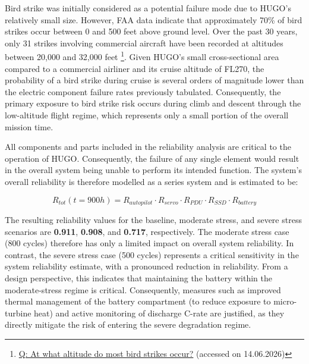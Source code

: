 Bird strike was initially considered as a potential failure mode due to HUGO’s relatively small size. However, FAA data indicate that approximately 70\% of bird strikes occur between 0 and 500 feet above ground level. Over the past 30 years, only 31 strikes involving commercial aircraft have been recorded at altitudes between 20,000 and 32,000 feet \footnote{\href{https://www.faa.gov/airports/airport_safety/wildlife/faq}{Q: At what altitude do most bird strikes occur?} (accessed on 14.06.2026)}. Given HUGO’s small cross-sectional area compared to a commercial airliner and its cruise altitude of FL270, the probability of a bird strike during cruise is several orders of magnitude lower than the electric component failure rates previously tabulated. Consequently, the primary exposure to bird strike risk occurs during climb and descent through the low-altitude flight regime, which represents only a small portion of the overall mission time.

All components and parts included in the reliability analysis are critical to the operation of HUGO. Consequently, the failure of any single element would result in the overall system being unable to perform its intended function. The system’s overall reliability is therefore modelled as a series system \cite{Mencik2016} and is estimated to be:

\begin{equation}
    R_{tot}(t=900h) = R_{autopilot} \cdot R_{servo} \cdot R_{PDU} \cdot R_{SSD} \cdot R_{battery}
\end{equation}


The resulting reliability values for the baseline, moderate stress, and severe stress scenarios are \textbf{0.911}, \textbf{0.908}, and \textbf{0.717}, respectively. The moderate stress case (800 cycles) therefore has only a limited impact on overall system reliability. In contrast, the severe stress case (500 cycles) represents a critical sensitivity in the system reliability estimate, with a pronounced reduction in reliability. From a design perspective, this indicates that maintaining the battery within the moderate-stress regime is critical. Consequently, measures such as improved thermal management of the battery compartment (to reduce exposure to micro-turbine heat) and active monitoring of discharge C-rate are justified, as they directly mitigate the risk of entering the severe degradation regime.

